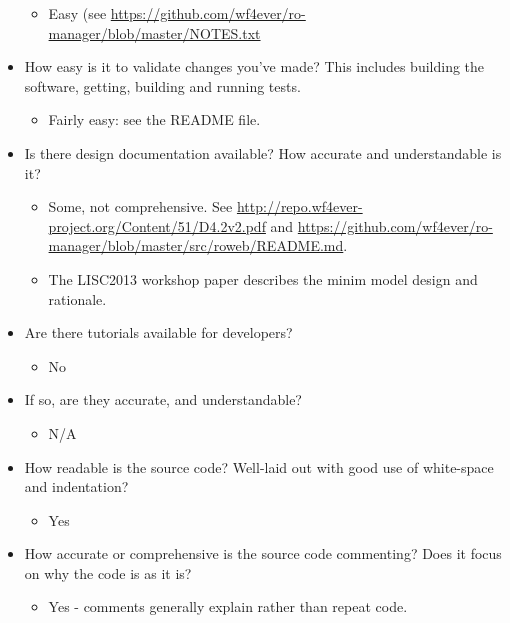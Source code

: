\begin{itemize}
  \begin{itemize}
  \itemsep1pt\parskip0pt
  \item
    Easy (see
    \url{https://github.com/wf4ever/ro-manager/blob/master/NOTES.txt}
  \end{itemize}
\item
  How easy is it to validate changes you've made? This includes building
  the software, getting, building and running tests.

  \begin{itemize}
  \itemsep1pt\parskip0pt
  \item
    Fairly easy: see the README file.
  \end{itemize}
\item
  Is there design documentation available? How accurate and
  understandable is it?

  \begin{itemize}
  \itemsep1pt\parskip0pt
  \item
    Some, not comprehensive. See
    \url{http://repo.wf4ever-project.org/Content/51/D4.2v2.pdf} and
    \url{https://github.com/wf4ever/ro-manager/blob/master/src/roweb/README.md}.
  \item
    The LISC2013 workshop paper describes the minim model design and
    rationale.
  \end{itemize}
\item
  Are there tutorials available for developers?

  \begin{itemize}
  \itemsep1pt\parskip0pt
  \item
    No
  \end{itemize}
\item
  If so, are they accurate, and understandable?

  \begin{itemize}
  \itemsep1pt\parskip0pt
  \item
    N/A
  \end{itemize}
\item
  How readable is the source code? Well-laid out with good use of
  white-space and indentation?

  \begin{itemize}
  \itemsep1pt\parskip0pt
  \item
    Yes
  \end{itemize}
\item
  How accurate or comprehensive is the source code commenting? Does it
  focus on why the code is as it is?

  \begin{itemize}
  \itemsep1pt\parskip0pt
  \item
    Yes - comments generally explain rather than repeat code.
  \end{itemize}
\end{itemize}

